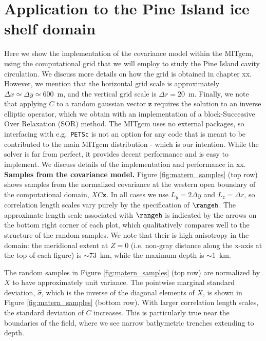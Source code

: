 \section{Application to the Pine Island ice shelf domain}
\label{sec:matern_pig}

Here we show the implementation of the covariance model within the MITgcm,
using the computational grid that we will employ to study the Pine Island cavity
circulation.
We discuss more details on how the grid is obtained in
chapter xx.
However, we mention that the horizontal grid scale is
approximately $\Delta x \simeq \Delta y \simeq 600$~m, and the vertical grid
scale is $\Delta r = 20$~m.
Finally, we note that applying $C$ to a random gaussian vector $\mathbf{z}$
requires the solution to an inverse elliptic operator,
which we obtain with an implementation of a block-Successive Over Relaxation
(SOR) method.
The MITgcm uses no external packages, so interfacing with
e.g.\ \texttt{PETSc} is not an option for any code that is meant to be
contributed to the main MITgcm distribution - which is our intention.
While the solver is far from perfect, it provides decent performance and is
easy to implement.
We discuss details of the implementation and
performance in xx. \\

\noindent\textbf{Samples from the covariance model.}
Figure \ref{fig:matern_samples} (top row) shows samples from the normalized
covariance at the western open boundary of the computational domain,
$XC\mathbf{z}$.
In all cases we use $L_y = 2\Delta y$ and $L_z = \Delta r$, so correlation
length scales vary purely by the specification of $\rangeh$.
The approximate length scale associated with $\rangeh$ is indicated by the arrows on
the bottom right corner of each plot, which qualitatively compares well to the
structure of the random samples.
We note that their is high anisotropy in the domain:
the meridional extent at $Z=0$ (i.e. non-gray distance along the x-axis at the
top of each figure) is $\sim$73~km, while the maximum depth is $\sim1$~km.

The random samples in Figure \ref{fig:matern_samples} (top row)
are normalized by $X$ to have approximately unit variance.
The pointwise marginal standard deviation, $\hat{\sigma}$, which is the inverse
of the diagonal elements of $X$, is shown in Figure \ref{fig:matern_samples}
(bottom row).
With larger correlation length scales, the standard deviation of $C$ increases.
This is particularly true near the boundaries of the field, where we see narrow
bathymetric trenches extending to depth.\\

